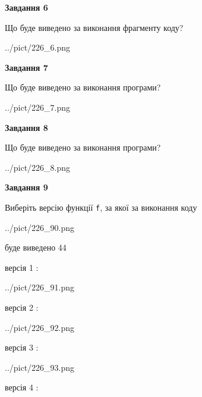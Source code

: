 \documentclass[12pt, ukrainian]{article}
\def\code#1{\Verb!#1!}
\begin{document}
{\begin {large}
{\begin {center}\textbf{Завдання 6}\end {center}}

Що буде виведено за виконання фрагменту коду?\par
\begin{center}
	{../pict/226_6.png}
\end{center}
\newpage

{\begin {center}\textbf{Завдання 7}\end {center}}

Що буде виведено за виконання програми?\par
\begin{center}
	{../pict/226_7.png}
\end{center}
\newpage

{\begin {center}\textbf{Завдання 8}\end {center}}

Що буде виведено за виконання програми?\par
\begin{center}
	{../pict/226_8.png}
\end{center}
\newpage

{\begin {center}\textbf{Завдання 9}\end {center}}

Виберіть версію функції \code{f}, за якої за виконання коду
\begin{center}
	{../pict/226_90.png}
\end{center}
буде виведено 44

\vspace{5mm}
версія 1 :

\begin{center}
	{../pict/226_91.png}
\end{center}
версія 2 :

\begin{center}
	{../pict/226_92.png}
\end{center}
версія 3 :

\begin{center}
	{../pict/226_93.png}
\end{center}
версія 4 :


\end{large}}
\end{document}
